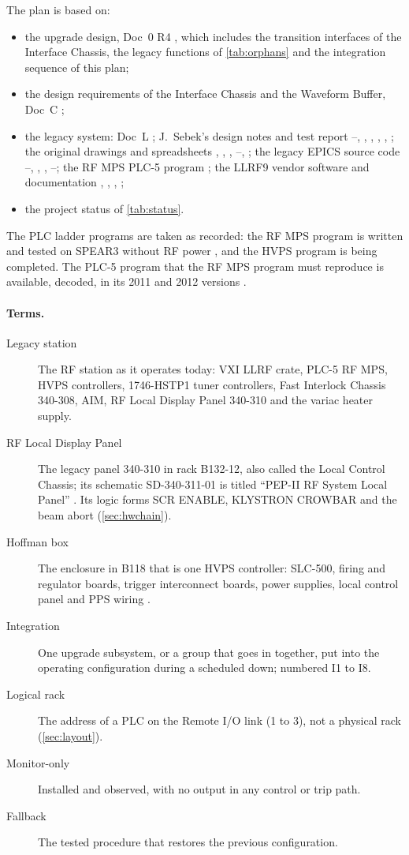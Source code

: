 The plan is based on:
\begin{itemize}
\item the upgrade design, Doc~0 R4 , which includes the transition interfaces of
the Interface Chassis, the legacy functions of \cref{tab:orphans} and the integration
sequence of this plan;
\item the design requirements of the Interface Chassis and the Waveform Buffer, Doc~C
;
\item the legacy system: Doc~L ; J.~Sebek's design notes and test report
--, , , , , ; the original drawings and spreadsheets
, , , --, ; the legacy EPICS source code
--, , , --; the RF MPS PLC-5 program ; the
LLRF9 vendor software and documentation , , , ;
\item the project status of \cref{tab:status}.
\end{itemize}
The PLC ladder programs are taken as recorded: the RF MPS program is written and
tested on SPEAR3 without RF power , and the HVPS program is being completed. The
PLC-5 program that the RF MPS program must reproduce is available, decoded, in its
2011 and 2012 versions .

\paragraph{Terms.}
\begin{description}
\item[Legacy station] The RF station as it operates today: VXI LLRF crate, PLC-5 RF
MPS, HVPS controllers, 1746-HSTP1 tuner controllers, Fast Interlock Chassis 340-308,
AIM, RF Local Display Panel 340-310 and the variac heater supply.
\item[RF Local Display Panel] The legacy panel 340-310 in rack B132-12, also called
the Local Control Chassis; its schematic SD-340-311-01 is titled ``PEP-II RF System
Local Panel'' . Its logic forms SCR ENABLE, KLYSTRON CROWBAR and the beam abort
(\cref{sec:hwchain}).
\item[Hoffman box] The enclosure in B118 that is one HVPS controller: SLC-500, firing
and regulator boards, trigger interconnect boards, power supplies, local control panel
and PPS wiring .
\item[Integration] One upgrade subsystem, or a group that goes in together, put into
the operating configuration during a scheduled down; numbered I1 to I8.
\item[Logical rack] The address of a PLC on the Remote I/O link (1 to 3), not a
physical rack (\cref{sec:layout}).
\item[Monitor-only] Installed and observed, with no output in any control or trip
path.
\item[Fallback] The tested procedure that restores the previous configuration.
\end{description}

